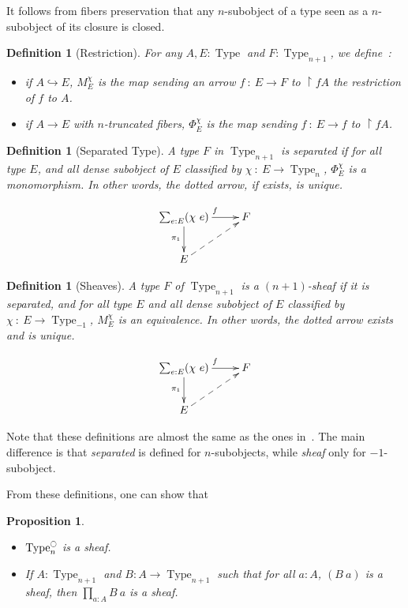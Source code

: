 \documentclass[conference]{IEEEtran}
\newtheorem{prop}[thm]{Proposition}
\newtheorem{defi}[thm]{Definition}
\DeclareMathOperator{\Type}{Type}
\newcommand{\modal}{\ensuremath{\ocircle}}
\begin{document}
It follows from fibers preservation that any $n$-subobject of a type seen as a $n$-subobject
of its closure is closed.

\begin{defi}[Restriction]
  For any $A, E:\Type$ and $F:\Type_{n+1}$, we define~:
  \begin{itemize}
  \item if $A \hookrightarrow E$, $M_E^\chi$ is the map sending an
    arrow $f~:~E\to F$ to $\restriction f A$ the restriction of $f$ to $A$.
  \item if $A \to E$ with $n$-truncated fibers, $\Phi_E^\chi$ is the
    map sending $f~:~E \to f$ to $\restriction f A$.
  \end{itemize}
\end{defi}

\begin{defi}[Separated Type]
  A type $F$ in $\Type_{n+1}$ is {\em separated} if for all type $E$, and
  all dense subobject of $E$ classified by $\chi~:~E \to \Type_n$,
  $\Phi_E^\chi$ is a monomorphism. In other words, the dotted arrow,
  if exists, is unique.

  $$\xymatrix{
    \sum_{e:E} (\chi~ e) \ar[r]^f \ar[d]_{\pi_1} & F \\
    E \ar@{-->}[ru]&
  }$$
\end{defi}

\begin{defi}[Sheaves]
  A type $F$ of $\Type_{n+1}$ is a {\em $(n+1)$-sheaf} if it is
  separated, and for all type $E$ and all dense subobject of $E$
  classified by $\chi~:~E \to \Type_{-1}$, $M_E^\chi$ is an
  equivalence. In other words, the dotted arrow exists and is unique.

  $$\xymatrix{
    \sum_{e:E} (\chi~ e) \ar[r]^f \ar[d]_{\pi_1} & F \\
    E \ar@{-->}[ru]&
  }$$
\end{defi}

Note that these definitions are almost the same as the ones
in~\cite{maclanemoerdijk}. The main difference is that {\em separated}
is defined for $n$-subobjects,
while {\em sheaf} only for $-1$-subobject.

From these definitions, one can show that
\begin{prop}\label{prop:sheaf_prop}
  \begin{itemize}
  \item $\Type_n^\modal$ is a sheaf.
  \item If $A:\Type_{n+1}$ and $B:A \to \Type_{n+1}$ such that for all
    $a:A$, $(B~a)$ is a sheaf, then $\prod_{a:A}B~a$ is a sheaf.
  \end{itemize}
\end{prop}
\end{document}
